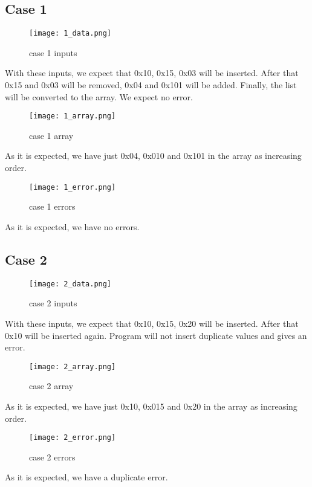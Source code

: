 \documentclass[pdftex,12pt,a4paper]{article}
\begin{document}
\subsection{Case 1}
\begin{figure}[H]
	\centering
	\texttt{[image: 1\_data.png]}
	\caption{case 1 inputs}
	\label{}
\end{figure}
With these inputs, we expect that 0x10, 0x15, 0x03 will be inserted. After that 0x15 and 0x03 will be removed, 0x04 and 0x101 will be added. Finally, the list will be converted to the array. We expect no error.
\begin{figure}[H]
	\centering
	\texttt{[image: 1\_array.png]}
	\caption{case 1 array}
	\label{}
\end{figure}
As it is expected, we have just 0x04, 0x010 and 0x101 in the array as increasing order.
\begin{figure}[H]
	\centering
	\texttt{[image: 1\_error.png]}
	\caption{case 1 errors}
	\label{}
\end{figure}
As it is expected, we have no errors.

\subsection{Case 2}
\begin{figure}[H]
	\centering
	\texttt{[image: 2\_data.png]}
	\caption{case 2 inputs}
	\label{}
\end{figure}
With these inputs, we expect that 0x10, 0x15, 0x20 will be inserted. After that 0x10 will be inserted again. Program will not insert duplicate values and gives an error.
\begin{figure}[H]
	\centering
	\texttt{[image: 2\_array.png]}
	\caption{case 2 array}
	\label{}
\end{figure}
As it is expected, we have just 0x10, 0x015 and 0x20 in the array as increasing order.
\begin{figure}[H]
	\centering
	\texttt{[image: 2\_error.png]}
	\caption{case 2 errors}
	\label{}
\end{figure}
As it is expected, we have a duplicate error.
\end{document}

